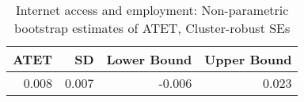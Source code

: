\begin{table}[!h]
\centering
\caption{\label{tab:tab:np_atet_clustered}Internet access and employment: Non-parametric bootstrap estimates of ATET, Cluster-robust SEs}
\centering
\begin{tabular}[t]{rrrr}
\toprule
ATET & SD & Lower Bound & Upper Bound\\
\midrule
0.008 & 0.007 & -0.006 & 0.023\\
\bottomrule
\end{tabular}
\end{table}
